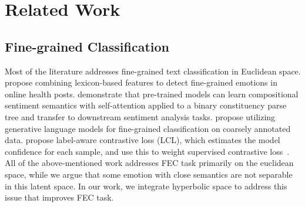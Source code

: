 \section{Related Work}
\subsection{Fine-grained Classification}
Most of the literature addresses fine-grained text classification in Euclidean space.
\citet{khanpour-caragea-2018-fine} propose combining lexicon-based features to
detect fine-grained emotions in online health posts.
\citet{yin-etal-2020-sentibert} demonstrate that pre-trained models can
learn compositional sentiment semantics with self-attention applied to a
binary constituency parse tree and transfer to downstream sentiment
analysis tasks.
\citet{coarse2fine} propose utilizing generative language models for
fine-grained classification on coarsely annotated data.
\citet{suresh-ong-2021-negatives} propose label-aware contrastive loss (LCL),
which estimates the model confidence for each sample, and use this to weight
supervised contrastive loss~\cite{NEURIPS2020_supcon}. 
All of the above-mentioned work addresses FEC task primarily on the euclidean space, while we argue that some emotion with close semantics are not separable in this latent space. In our work, we integrate hyperbolic space to address this issue that improves FEC task.

